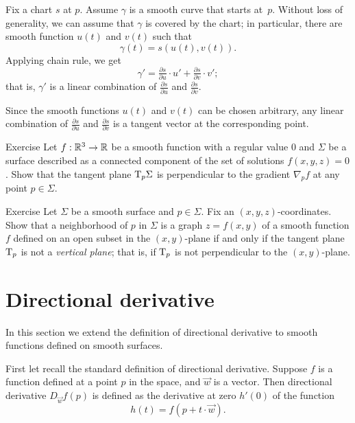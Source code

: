 Fix a chart $s$ at $p$.
Assume $\gamma$ is a smooth curve that starts at~$p$.
Without loss of generality, we can assume that $\gamma$ is covered by the chart;
in particular, there are smooth function $u(t)$ and $v(t)$ such that 
\[\gamma(t)=s(u(t),v(t)).\]
Applying chain rule, we get
\[\gamma'=\tfrac{\partial s}{\partial u}\cdot u'+ \tfrac{\partial s}{\partial v}\cdot v';\]
that is, $\gamma'$ is a linear combination of $\tfrac{\partial s}{\partial u}$ and $\tfrac{\partial s}{\partial v}$.

Since the smooth functions $u(t)$ and $v(t)$ can be chosen arbitrary, any linear combination of $\tfrac{\partial s}{\partial u}$ and $\tfrac{\partial s}{\partial v}$ is a tangent vector at the corresponding point. 
\qeds


\begin{thm}{Exercise}\label{ex:tangent-normal}
Let $f:\mathbb{R}^3\to\mathbb{R}$ be a smooth function with a regular value $0$ and $\Sigma$ be a surface described as a connected component of the set of solutions $f(x,y,z)=0$.
Show that the tangent plane $\mathrm{T}_p\Sigma$ is perpendicular to the gradient $\nabla_pf$ at any point $p\in\Sigma$.
\end{thm}

\begin{thm}{Exercise}\label{ex:vertical-tangent}
Let $\Sigma$ be a smooth surface and $p\in\Sigma$.
Fix an $(x,y,z)$-coordinates.
Show that a neighborhood of $p$ in $\Sigma$ is a graph $z=f(x,y)$ of a smooth function $f$ defined on an open subset in the $(x,y)$-plane if and only if the tangent plane $\mathrm{T}_p$ is not a \emph{vertical plane}; that is, if $\mathrm{T}_p$ is not perpendicular to the $(x,y)$-plane.
\end{thm}


\section*{Directional derivative}

In this section we extend the definition of directional derivative to smooth functions defined on smooth surfaces.

First let recall the standard definition of directional derivative.
Suppose $f$ is a function defined at a point $p$ in the space, and $\vec w$ is a vector.
Then directional derivative $D_{\vec w}f(p)$ is defined as the derivative at zero $h'(0)$ of the function
\[h(t)=f(p+t\cdot\vec w).\]

